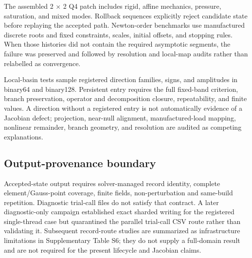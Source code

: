 \documentclass[preprint,12pt,authoryear]{elsarticle}
\begin{document}
The assembled 2 \ensuremath{\times} 2 Q4 patch includes rigid, affine mechanics, pressure, saturation, and mixed modes. Rollback sequences explicitly reject candidate state before replaying the accepted path. Newton-order benchmarks use manufactured discrete roots and fixed constraints, scales, initial offsets, and stopping rules. When those histories did not contain the required asymptotic segments, the failure was preserved and followed by resolution and local-map audits rather than relabelled as convergence.

Local-basin tests sample registered direction families, signs, and amplitudes in binary64 and binary128. Persistent entry requires the full fixed-band criterion, branch preservation, operator and decomposition closure, repeatability, and finite values. A direction without a registered entry is not automatically evidence of a Jacobian defect; projection, near-null alignment, manufactured-load mapping, nonlinear remainder, branch geometry, and resolution are audited as competing explanations.

\subsection{Output-provenance boundary}

Accepted-state output requires solver-managed record identity, complete element/Gauss-point coverage, finite fields, non-perturbation and same-build repetition. Diagnostic trial-call files do not satisfy that contract. A later diagnostic-only campaign established exact sharded writing for the registered single-thread case but quarantined the parallel trial-call CSV route rather than validating it. Subsequent record-route studies are summarized as infrastructure limitations in Supplementary Table S6; they do not supply a full-domain result and are not required for the present lifecycle and Jacobian claims.
\end{document}

